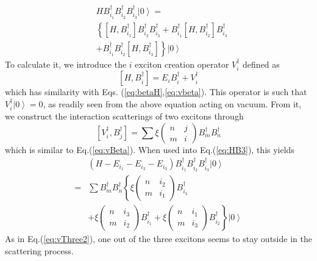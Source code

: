 \documentclass[aps,prb,superscriptaddress,showpacs,reprint,lengthcheck]{revtex4}
\begin{document}
\begin{equation}\label{eq:HB3}
\begin{split}
&HB^{\dagger}_{i_1}B^{\dagger}_{i_2}B^{\dagger}_{i_3}\left|0\right>=\\
&\left\{\left[H,B^{\dagger}_{i_1}\right] B^{\dagger}_{i _2}B^{\dagger}_{i_3}+B^{\dagger}_{i_1}%
\left[H,B^{\dagger}_{i_2}\right] B^{\dagger}_{i_3}\right.\\ 
&\left.+B^{\dagger}_{i_1}B^{\dagger}_{i_2}\left[H,B^{\dagger}_{i_3}\right]  \right\}\left|0\right> 
\end{split}
\end{equation} 
To calculate it, we introduce the $i$ exciton creation operator $V^\dagger_i$ defined as
\begin{equation}
\left[H,B^{\dagger}_{i}\right]=E_iB^\dagger_i+V^\dagger_i
\end{equation}
 which has similarity with Eqs. (\ref{eq:betaH},\ref{eq:vbeta}). This operator is such that $V^{\dagger}_{i}\left|0\right>=0$, as readily seen from the above equation acting on vacuum.  From it, we construct the interaction scatterings of two excitons through
 \begin{equation}  
\left[V^{\dagger}_{i},B^{\dagger}_{j}\right] 
=\sum\xi\left(\begin{smallmatrix}n&j\\m&i\end{smallmatrix}%
\right)  B^{\dagger}_{m}B^{\dagger}_{n}
\end{equation}
which is similar to Eq.(\ref{eq:vBeta}). When used into Eq.(\ref{eq:HB3}), this yields
\begin{equation}\label{eq:HEEE}
\begin{split}
&(H-E_{i_1}-E_{i_2}-E_{i_3})B^{\dagger}_{i_1}B^{\dagger}_{i_2}B^{\dagger}_{i_3}\left|0\right>\\
=&\sum{}B^\dagger_mB^\dagger_n\left\{
	\xi\left(\begin{smallmatrix}n&i_2\\m&i_1\end{smallmatrix}\right)B^{\dagger}_{i_3}\right.\\
	&\left.	+\xi\left(\begin{smallmatrix}n&i_3\\m&i_2\end{smallmatrix}\right)B^{\dagger}_{i_1}	+\xi\left(\begin{smallmatrix}n&i_1\\m&i_3\end{smallmatrix}\right)B^{\dagger}_{i_2}\right\}\left|0\right>
\end{split}
\end{equation}
As in Eq.(\ref{eq:vThree2}), one out of the three excitons seems to stay outside in the scattering process.
\end{document}

